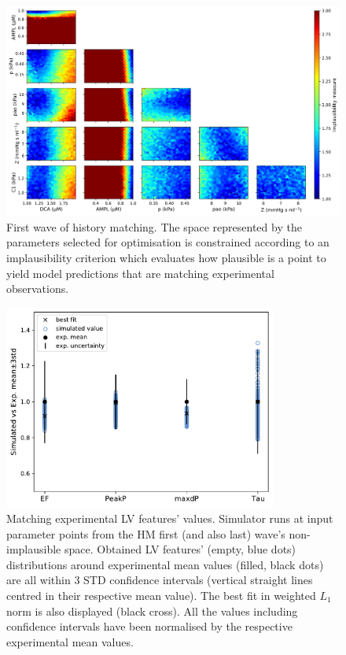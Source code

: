 \begin{figure}[!ht]
    \myfloatalign
    \includegraphics[width=\textwidth]{figures/chapter07/wave_1.png}
    \caption{First wave of history matching. The space represented by the parameters selected for optimisation is constrained according to an implausibility criterion which evaluates how plausible is a point to yield model predictions that are matching experimental observations.}  
    \label{fig:w1zsf1rat}
\end{figure}

\begin{figure}[!ht]
    \myfloatalign
    \includegraphics[width=0.8\textwidth]{figures/chapter07/w1_features_match.pdf}
    \caption{Matching experimental LV features' values. Simulator runs at input parameter points from the HM first (and also last) wave's non-implausible space. Obtained LV features’ (empty, blue dots) distributions around experimental mean values (filled, black dots) are all within 3 STD confidence intervals (vertical straight lines centred in their respective mean value). The best fit in weighted $L_1$ norm is also displayed (black cross). All the values including confidence intervals have been normalised by the respective experimental mean values.}
    \label{fig:w1bestzsf1model}
\end{figure}

